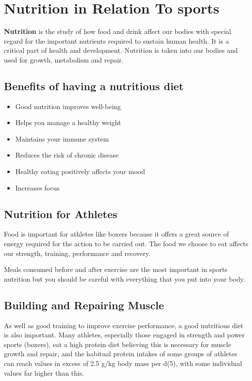 \documentclass[a4paper,12pt]{report}
\begin{document}
\section{Nutrition in Relation To sports}
\textbf{Nutrition} is the study of how food and drink affect our bodies with special regard for the important nutrients required to sustain human health. It is a critical part of health and development. Nutrition is taken into our bodies and used for growth, metabolism and repair.

\subsection{Benefits of having a nutritious diet}
\begin{itemize}
    \item Good nutrition improves well-being 
    \item Helps you manage a healthy weight
    \item Maintains your immune system
    \item Reduces the risk of chronic disease
    \item Healthy eating positively affects your mood
    \item Increases focus
\end{itemize}

\subsection{Nutrition for Athletes}
Food is important for athletes like boxers because it offers a great source of energy required for the action to be carried out. The food we choose to eat affects our strength, training, performance and recovery.

Meals consumed before and after exercise are the most important in sports nutrition but you should be careful with everything that you put into your body.  \cite{Nutrition}

\subsection{Building and Repairing Muscle}
As well as good training to improve exercise performance, a good nutritious diet is also important. Many athletes, especially those engaged in strength and power sports (boxers), eat a high protein diet believing this is necessary for muscle growth and repair, and the habitual protein intakes of some groups of athletes can reach values in excess of 2.5 g/kg body mass per d(5), with some individual values far higher than this. \cite{maughan2012nutrition}
\end{document}

